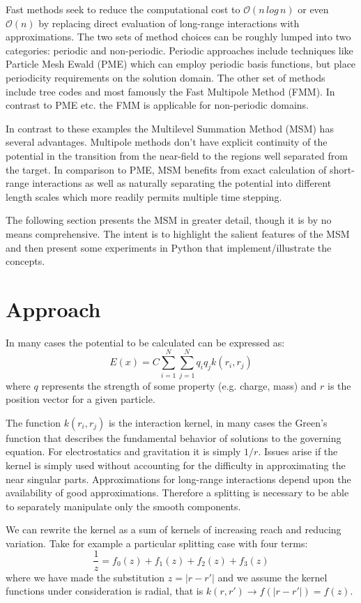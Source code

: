 \documentclass[review]{siamart}
\newcommand{\be}{\begin{equation}}
\newcommand{\ee}{\end{equation}}
\begin{document}
Fast methods seek to reduce the computational cost to  $\mathcal{O}(n\, log\, n)$ or even  $\mathcal{O}(n)$ by replacing direct evaluation of long-range interactions with approximations. The two sets of method choices can be roughly lumped into two categories: periodic and non-periodic. Periodic approaches include techniques like Particle Mesh Ewald (PME) which can employ periodic basis functions, but place periodicity requirements on the solution domain. The other set of methods include tree codes and most famously the Fast Multipole Method (FMM). In contrast to PME etc. the FMM is applicable for non-periodic domains.

In contrast to these examples the Multilevel Summation Method (MSM) has several advantages. Multipole methods don't have explicit continuity of the potential  in the transition from the near-field to the regions well separated from the target. In comparison to PME, MSM benefits from exact calculation of short-range interactions as well as naturally separating the potential into different length scales which more readily permits multiple time stepping.\cite{2}

The following section presents the MSM in greater detail, though it is by no means comprehensive. The intent is to highlight the salient features of the MSM and then present some experiments in Python that implement/illustrate the concepts.

\section{Approach}\label{sec:main}
In many cases the potential to be calculated can be expressed as:
\be E(x) = C \sum_{i=1}^N \sum_{j=1}^N q_i q_j k(r_i,r_j)\ee
where $q$ represents the strength of some property (e.g. charge, mass) and $r$ is the position vector for a given particle.

The function $k(r_i, r_j)$ is the interaction kernel, in many cases the Green's function that describes the fundamental behavior of solutions to the governing equation. For electrostatics and gravitation it is simply $1/r$. Issues arise if the kernel is simply used without accounting for the difficulty in approximating the near singular parts. Approximations for long-range interactions depend upon the availability of good approximations. Therefore a splitting is necessary to be able to separately manipulate only the smooth components.

We can rewrite the kernel as a sum of kernels of increasing reach and reducing variation. Take for example a particular splitting case\cite{3} with four terms:
\be \frac{1}{z} = f_0(z)+f_1(z)+f_2(z)+f_3(z) \ee
where we have made the substitution $z = |r-r'|$ and we assume the kernel functions under consideration is radial, that is $k(r,r') \rightarrow f(|r-r'|)=f(z)$.
\end{document}
